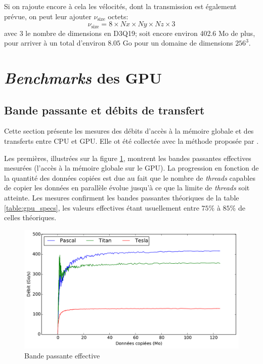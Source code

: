 Si on rajoute encore à cela les vélocités, dont la transmission est également prévue, on peut leur ajouter $\nu_\mathrm{size}$ octets:
\begin{equation}
\nu_\mathrm{size} = 8 \times Nx \times Ny \times Nz \times 3
\end{equation}
avec $3$ le nombre de dimensions en D3Q19; soit encore environ 402.6 Mo de plus, pour arriver à un total d'environ $8.05$ Go pour un domaine de dimensions $256^3$.

\section{\textit{Benchmarks} des \acs{GPU}} \label{title-benchmark_gpu}

\subsection{Bande passante et débits de transfert}
Cette section présente les mesures des débits d'accès à la mémoire globale et des transferts entre \acs{CPU} et \acs{GPU}. Elle ot été collectée avec la méthode proposée par \cite{noauthor_how_2012}.

Les premières, illustrées sur la figure \ref{fig:bandwidth}, montrent les bandes passantes effectives mesurées (l'accès à la mémoire globale sur le \acs{GPU}). La progression en fonction de la quantité des données copiées est due au fait que le nombre de \textit{threads} capables de copier les données en parallèle évolue jusqu'à ce que la limite de \textit{threads} soit atteinte. Les mesures confirment les bandes passantes théoriques de la table \ref{table:gpu_specs}, les valeurs effectives étant usuellement entre $75\%$ à $85\%$ de celles théoriques.

\begin{figure}[h]
	\centering
	\includegraphics[fbox, scale=0.61]{images/perfs/throughput/bandwidth.pdf}
	\caption{Bande passante effective}
	\label{fig:bandwidth}
\end{figure}

